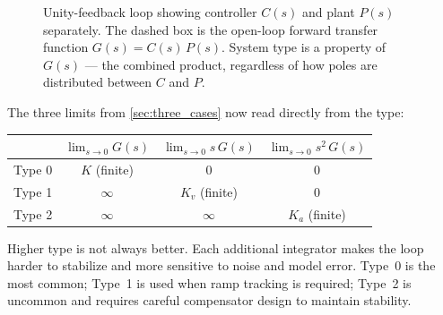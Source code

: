 \documentclass[12pt]{article}
\begin{document}
\begin{figure}[htbp]
\centering
{}
\caption{Unity-feedback loop showing controller $C(s)$ and plant $P(s)$
  separately.  The dashed box is the open-loop forward transfer function
  $G(s) = C(s)\,P(s)$.  System type is a property of $G(s)$ --- the combined
  product, regardless of how poles are distributed between $C$ and $P$.}
\label{fig:cl_with_type}
\end{figure}

The three limits from \cref{sec:three_cases} now read directly from the type:

\begin{center}
\begin{tabular}{lccc}
\toprule
 & $\lim_{s\to 0} G(s)$ & $\lim_{s\to 0} s\,G(s)$ & $\lim_{s\to 0} s^2\,G(s)$ \\
\midrule
Type 0 & $K$ (finite) & $0$          & $0$          \\
Type 1 & $\infty$     & $K_v$ (finite) & $0$          \\
Type 2 & $\infty$     & $\infty$     & $K_a$ (finite) \\
\bottomrule
\end{tabular}
\end{center}

Higher type is not always better.  Each additional integrator makes the loop
harder to stabilize and more sensitive to noise and model error.  Type~0 is
the most common; Type~1 is used when ramp tracking is required; Type~2 is
uncommon and requires careful compensator design to maintain stability.
\end{document}
